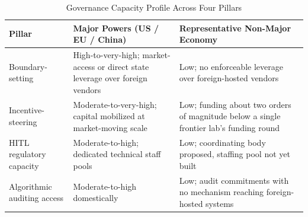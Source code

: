 \documentclass{ieeeaccess}
\begin{document}
\begin{table}[!t]
\caption{Governance Capacity Profile Across Four Pillars}
\label{tab:comparison}
\centering
\footnotesize
\begin{tabular}{>{\raggedright\arraybackslash}p{1.35cm}>{\raggedright\arraybackslash}p{1.85cm}>{\raggedright\arraybackslash}p{1.85cm}}
\toprule
\rowcolor{darkblue!15}
\textbf{Pillar} & \textbf{Major Powers (US / EU / China)} & \textbf{Representative Non-Major Economy} \\
\midrule
\rowcolor{steelblue!8}
Boundary-setting & High-to-very-high; market-access or direct state leverage over foreign vendors & Low; no enforceable leverage over foreign-hosted vendors \\
\rowcolor{tealcolor!8}
Incentive-steering & Moderate-to-very-high; capital mobilized at market-moving scale & Low; funding about two orders of magnitude below a single frontier lab's funding round \\
\rowcolor{ambercolor!8}
HITL regulatory capacity & Moderate-to-high; dedicated technical staff pools & Low; coordinating body proposed, staffing pool not yet built \\
\rowcolor{slateblue!8}
Algorithmic auditing access & Moderate-to-high domestically & Low; audit commitments with no mechanism reaching foreign-hosted systems \\
\bottomrule
\end{tabular}
\end{table}
\end{document}
